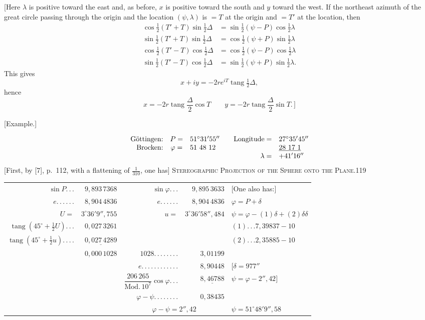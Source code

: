 [Here $\lambda$ is positive toward the east and, as before, $x$ is positive toward the south and $y$ toward the west. If the northeast azimuth of the great circle passing through the origin and the location $(\psi,\lambda)$ is $=T$ at the origin and $=T'$ at the location, then
\[
\begin{aligned}
\cos\tfrac12(T'+T)\sin\tfrac12\Delta&=\sin\tfrac12(\psi-P)\cos\tfrac12\lambda\\
\sin\tfrac12(T'+T)\sin\tfrac12\Delta&=\cos\tfrac12(\psi+P)\sin\tfrac12\lambda\\
\cos\tfrac12(T'-T)\cos\tfrac12\Delta&=\cos\tfrac12(\psi-P)\cos\tfrac12\lambda\\
\sin\tfrac12(T'-T)\cos\tfrac12\Delta&=\sin\tfrac12(\psi+P)\sin\tfrac12\lambda.
\end{aligned}
\]
This gives
\[
x+iy=-2re^{iT}\operatorname{tang}\tfrac12\Delta,
\]
hence
\[
x=-2r\operatorname{tang}\frac\Delta2\cos T\qquad y=-2r\operatorname{tang}\frac\Delta2\sin T.\,]
\]
\begin{center}[Example.]\end{center}
\[
\begin{array}{rcl@{\qquad}rl}
\text{Göttingen:}&P=&51^\circ31'55''&\text{Longitude}=&27^\circ35'45''\\
\text{Brocken:}&\varphi=&51\ 48\ 12&&\underline{28\ 17\ 1}\\
&&&\lambda=&+41'16''
\end{array}
\]
[First, by [7], p.~112, with a flattening of $\tfrac1{310}$, one has]
\clearpage
\noindent\mbox{}\hfill{\small\textsc{Stereographic Projection of the Sphere onto the Plane.}}\hfill119\par\medskip
\begin{center}
\begingroup\fontsize{8}{11}\selectfont\setlength{\tabcolsep}{3pt}\renewcommand{\arraystretch}{1.4}
\begin{tabular}{@{}r@{ }r@{\quad}r@{ }r@{\quad}l@{}}
$\sin P.\,.\,.$&$9{,}893\,7368$&$\sin\varphi.\,.\,.$&$9{,}895\,3633$&[One also has:]\\
$e.\,.\,.\,.\,.\,.$&$8{,}904\,4836$&$e.\,.\,.\,.\,.\,.$&$8{,}904\,4836$&$\varphi=P+\delta$\\
$U=$&$3^\circ36'9''{,}755$&$u=$&$3^\circ36'58''{,}484$&$\psi=\varphi-(1)\delta+(2)\delta\delta$\\
$\operatorname{tang}(45^\circ+\tfrac12U).\,.\,.$&$0{,}027\,3261$&&&$(1).\,.\,. 7{,}39837-10$\\
$\operatorname{tang}(45^\circ+\tfrac12u).\,.\,.\,.$&$\underline{0{,}027\,4289}$&&&$(2).\,.\,. 2{,}35885-10$\\
&$0{,}000\,1028$&$1028.\,.\,.\,.\,.\,.\,.\,.$&$3{,}01199$&\\
&&$e.\,.\,.\,.\,.\,.\,.\,.\,.\,.\,.\,.$&$8{,}90448$&$[\delta=977''$\\
&&$\dfrac{206\,265}{\mathrm{Mod.}\,10^7}\cos\varphi.\,.\,.$&$\underline{8{,}46788}$&$\psi=\varphi-2''{,}42]$\\
&&$\varphi-\psi.\,.\,.\,.\,.\,.\,.\,.$&$0{,}38435$&\\
&&\multicolumn{2}{c}{$\varphi-\psi=2''{,}42$}&$\psi=51^\circ48'9''{,}58$
\end{tabular}\par\endgroup
\end{center}
